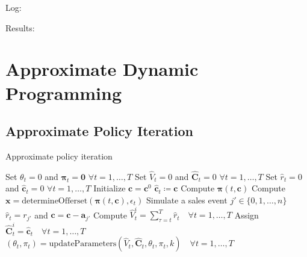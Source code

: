 Log:



Results:



\section{Approximate Dynamic Programming}

\subsection{Approximate Policy Iteration}

\begin{algorithm}
	\caption{Approximate policy iteration}\label{alg-API}
	\begin{algorithmic}[1]
		\State Set $\theta_t = 0$ and $\mathbf{\pi}_t = \mathbf{0}$ $\forall t = 1, \dots, T$
		\State Set $\hat{V}_t = 0$ and $\mathbf{\hat{C}}_t = 0$ $\forall t = 1, \dots, T$
		\State Set $\hat{r}_t = 0$ and $\mathbf{\hat{c}}_t = 0$ $\forall t = 1, \dots, T$
		\State Initialize $\mathbf{c} = \mathbf{c}^0$
		\State $\mathbf{\hat{c}}_t \coloneqq \mathbf{c}$
		\State Compute $\mathbf{\pi}(t, \mathbf{c})$ \label{alg-API-calcPi}
		\State Compute $\mathbf{x} = \text{determineOfferset}(\mathbf{\pi}(t, \mathbf{c}), \epsilon_t)$
		\State Simulate a sales event $j' \in \{0, 1, \dots, n\}$
		\State $\hat{r}_t = r_{j'}$ and $\mathbf{c} = \mathbf{c} - \mathbf{a}_{j'}$
		\EndIf
		\EndFor
		\State Compute $\hat{V}_t^i = \sum_{\tau = t}^{T}\hat{r}_t \quad \forall t = 1, \dots, T$
		\State Assign $\mathbf{\hat{C}}_t^i = \mathbf{\hat{c}}_t \quad \forall t = 1, \dots, T$
		\EndFor
		\State $\left(\theta_t, \pi_t \right) = \text{updateParameters}\left(\hat{V}_t, \mathbf{\hat{C}}_t, \theta_t, \pi_t, k\right) \quad \forall t = 1, \dots, T$ \label{alg-API-updateParam}
		\EndFor
	\end{algorithmic}
\end{algorithm}


